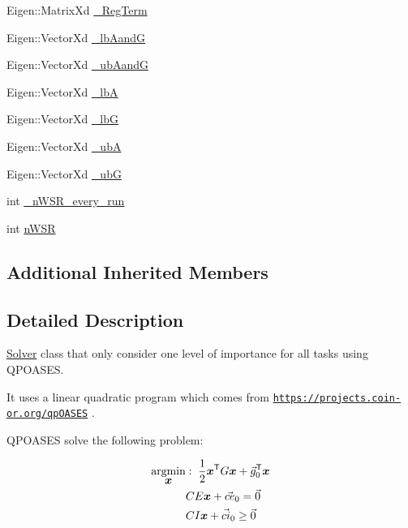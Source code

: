 \begin{DoxyCompactItemize}
\item 
Eigen\+::\+Matrix\+Xd \hyperlink{classocra_1_1OneLevelSolverWithQPOASES_a586d9c2c84fac9044466d33dabac9f79}{\+\_\+\+Reg\+Term}
\item 
Eigen\+::\+Vector\+Xd \hyperlink{classocra_1_1OneLevelSolverWithQPOASES_ad7277d89275d722da93143ea58888579}{\+\_\+lb\+AandG}
\item 
Eigen\+::\+Vector\+Xd \hyperlink{classocra_1_1OneLevelSolverWithQPOASES_afa4902490254547640625dc2d9512577}{\+\_\+ub\+AandG}
\item 
Eigen\+::\+Vector\+Xd \hyperlink{classocra_1_1OneLevelSolverWithQPOASES_a3004e673e3f883cfba0b53f0a078ccd4}{\+\_\+lbA}
\item 
Eigen\+::\+Vector\+Xd \hyperlink{classocra_1_1OneLevelSolverWithQPOASES_ace6b99f95cf3d633fb0bb96c7871c57f}{\+\_\+lbG}
\item 
Eigen\+::\+Vector\+Xd \hyperlink{classocra_1_1OneLevelSolverWithQPOASES_a9e476513e7486c38bdb69c8fdd3b35d1}{\+\_\+ubA}
\item 
Eigen\+::\+Vector\+Xd \hyperlink{classocra_1_1OneLevelSolverWithQPOASES_ac3b8f982ead7c50e7396d99e63f02ac3}{\+\_\+ubG}
\item 
int \hyperlink{classocra_1_1OneLevelSolverWithQPOASES_af1bb606a75434adb15ad68b6db213848}{\+\_\+n\+W\+S\+R\+\_\+every\+\_\+run}
\item 
int \hyperlink{classocra_1_1OneLevelSolverWithQPOASES_aa9c7ddcbafeff12cacea92ac658a63d6}{n\+W\+SR}
\end{DoxyCompactItemize}
\subsection*{Additional Inherited Members}


\subsection{Detailed Description}
\hyperlink{classocra_1_1Solver}{Solver} class that only consider one level of importance for all tasks using Q\+P\+O\+A\+S\+ES. 

It uses a linear quadratic program which comes from \href{https://projects.coin-or.org/qpOASES}{\tt https\+://projects.\+coin-\/or.\+org/qp\+O\+A\+S\+ES} .

Q\+P\+O\+A\+S\+ES solve the following problem\+:

\begin{align*} \underset{\mbox{\boldmath${x}$}}{\operatorname{argmin}} &: \; \frac{1}{2} \mbox{\boldmath${x}$}^{\mathsf{T}} G \mbox{\boldmath${x}$} + \vec{g}_0^{\mathsf{T}} \mbox{\boldmath${x}$} \\ & CE \mbox{\boldmath${x}$} + \vec{ce}_0 = \vec{0} \\ & CI \mbox{\boldmath${x}$} + \vec{ci}_0 \geq \vec{0} \end{align*} 

